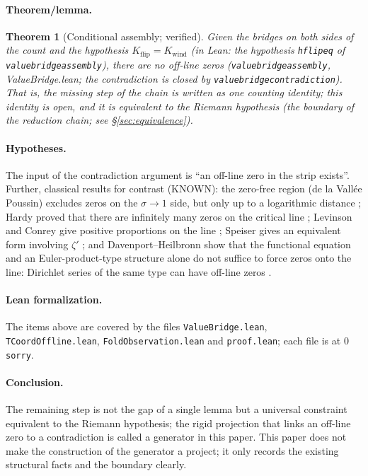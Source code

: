\documentclass{article}
\renewcommand{\_}{\underscoreOrig\allowbreak}
\newtheorem{theorem}{Theorem}[section]
\newcommand{\zt}{\zeta}
\begin{document}
\paragraph{Theorem/lemma.}
\begin{theorem}[Conditional assembly; verified]
\label{thm:assembly}
Given the bridges on both sides of the count and the hypothesis
$K_{\mathrm{flip}}=K_{\mathrm{wind}}$ (in Lean: the hypothesis
\texttt{hflip\_eq} of \texttt{value\_bridge\_assembly}), there are no
off-line zeros (\texttt{value\_bridge\_assembly}, ValueBridge.lean; the
contradiction is closed by \texttt{value\_bridge\_contradiction}). That
is, the missing step of the chain is written as one counting identity;
this identity is open, and it is equivalent to the Riemann hypothesis
(the boundary of the reduction chain; see \S\ref{sec:equivalence}).
\end{theorem}

\paragraph{Hypotheses.} The input of the contradiction argument is
``an off-line zero in the strip exists''. Further, classical results for
contrast (KNOWN): the zero-free region (de la Vall\'ee Poussin) excludes
zeros on the $\sigma\to1$ side, but only up to a logarithmic distance
\cite{hadamard1896, delavallee1899}; Hardy proved that there are
infinitely many zeros on the critical line \cite{hardy1914}; Levinson
and Conrey give positive proportions on the line
\cite{levinson1974, conrey1989}; Speiser gives an equivalent form
involving $\zt'$ \cite{speiser}; and Davenport--Heilbronn show that the
functional equation and an Euler-product-type structure alone do not
suffice to force zeros onto the line: Dirichlet series of the same type
can have off-line zeros \cite{davenport}.

\paragraph{Lean formalization.} The items above are covered by the files
\texttt{ValueBridge.lean}, \texttt{TCoordOffline.lean},
\texttt{FoldObservation.lean} and \texttt{proof.lean}; each file is at 0
\texttt{sorry}.

\paragraph{Conclusion.} The remaining step is not the gap of a single
lemma but a universal constraint equivalent to the Riemann hypothesis;
the rigid projection that links an off-line zero to a contradiction is
called a generator in this paper. This paper does not make the
construction of the generator a project; it only records the existing
structural facts and the boundary clearly.
\end{document}
